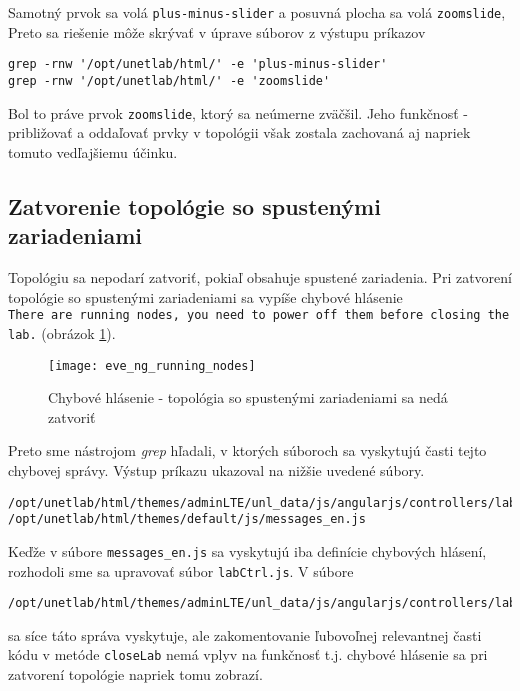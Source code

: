 Samotný prvok sa volá \texttt{plus-minus-slider} a posuvná plocha sa volá \texttt{zoomslide}, Preto sa riešenie môže skrývať v úprave súborov z výstupu príkazov
\begin{verbatim}
grep -rnw '/opt/unetlab/html/' -e 'plus-minus-slider'
grep -rnw '/opt/unetlab/html/' -e 'zoomslide'
\end{verbatim}

Bol to práve prvok \texttt{zoomslide}, ktorý sa neúmerne zväčšil. Jeho funkčnosť - približovať a oddaľovať prvky v topológii však zostala zachovaná aj napriek tomuto vedľajšiemu účinku.




\subsection{Zatvorenie topológie so spustenými zariadeniami}

Topológiu sa nepodarí zatvoriť, pokiaľ obsahuje spustené zariadenia. Pri zatvorení topológie so spustenými zariadeniami sa vypíše chybové hlásenie \\
\texttt{There are running nodes, you need to power off them before closing the lab.} (obrázok \ref{obr:eve_ng_running_nodes}). \\

\begin{figure}
    \centering
    \texttt{[image: eve\_ng\_running\_nodes]}
    \caption{Chybové hlásenie - topológia so spustenými zariadeniami sa nedá zatvoriť}
    \label{obr:eve_ng_running_nodes}
\end{figure}

Preto sme nástrojom \emph{grep} hľadali, v ktorých súboroch sa vyskytujú časti tejto chybovej správy. Výstup príkazu ukazoval na nižšie uvedené súbory. \\
\begin{verbatim}
/opt/unetlab/html/themes/adminLTE/unl_data/js/angularjs/controllers/lab/labCtrl.js
/opt/unetlab/html/themes/default/js/messages_en.js
\end{verbatim}

Keďže v súbore \texttt{messages\_en.js} sa vyskytujú iba definície chybových hlásení, rozhodoli sme sa upravovať súbor \texttt{labCtrl.js}. V súbore
\begin{verbatim}
/opt/unetlab/html/themes/adminLTE/unl_data/js/angularjs/controllers/lab/labCtrl.js
\end{verbatim}
sa síce táto správa vyskytuje, ale zakomentovanie ľubovoľnej relevantnej časti kódu v metóde \texttt{closeLab} nemá vplyv na funkčnosť t.j. chybové hlásenie sa pri zatvorení topológie napriek tomu zobrazí.

